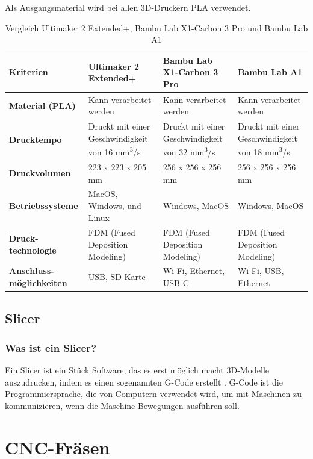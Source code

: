 Als Ausgangsmaterial wird bei allen 3D-Druckern PLA verwendet.
\begin{table} [H]
	\begin{tabular}{ |p{2.7cm} |p{4cm}|p{4cm}|p{4cm}| }
		\hline
		\textbf{Kriterien} & \textbf{Ultimaker 2 Extended+} & \textbf{Bambu Lab X1-Carbon 3 Pro} & \textbf{Bambu Lab A1} \\
		\hline
		\textbf{Material (PLA)} & Kann verarbeitet werden & Kann verarbeitet werden & Kann verarbeitet werden \\
		\hline
		\textbf{Drucktempo} & Druckt mit einer Geschwindigkeit von 16 mm\textsuperscript{3}/s & Druckt mit einer Geschwindigkeit von 32 mm\textsuperscript{3}/s & Druckt mit einer Geschwindigkeit von 18 mm\textsuperscript{3}/s \\
		\hline
		\textbf{Druckvolumen} & 223 x 223 x 205 mm & 256 x 256 x 256 mm & 256 x 256 x 256 mm \\
		\hline
		\textbf{Betriebssysteme} & MacOS, Windows, und Linux & Windows, MacOS & Windows, MacOS \\
		\hline
		\textbf{Druck-technologie} & FDM (Fused Deposition Modeling) & FDM (Fused Deposition Modeling) & FDM (Fused Deposition Modeling) \\
		\hline
		\textbf{Anschluss-möglichkeiten} & USB, SD-Karte & Wi-Fi, Ethernet, USB-C & Wi-Fi, USB, Ethernet \\
		\hline
	\end{tabular}
	\caption{Vergleich Ultimaker 2 Extended+, Bambu Lab X1-Carbon 3 Pro und Bambu Lab A1}
\end{table}



\subsection{Slicer}
\subsubsection{Was ist ein Slicer?}
Ein Slicer ist ein Stück Software, das es erst möglich macht 3D-Modelle auszudrucken, indem es einen sogenannten G-Code erstellt . G-Code ist die Programmiersprache, die von Computern verwendet wird, um mit Maschinen zu kommunizieren, wenn die Maschine Bewegungen ausführen soll. \parencite{SlicerGCode} \\


\newpage
\section{CNC-Fräsen}

